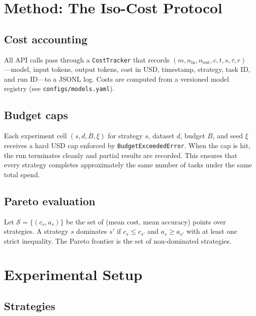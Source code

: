 \documentclass[11pt]{article}
\begin{document}
\section{Method: The Iso-Cost Protocol}

\subsection{Cost accounting}

All API calls pass through a \texttt{CostTracker} that records
$(m, n_{\text{in}}, n_{\text{out}}, c, t, s, \tau, r)$---model, input tokens,
output tokens, cost in USD, timestamp, strategy, task ID, and run ID---to a
JSONL log.  Costs are computed from a versioned model registry (see
\texttt{configs/models.yaml}).

\subsection{Budget caps}

Each experiment cell $(s, d, B, \xi)$ for strategy $s$, dataset $d$, budget
$B$, and seed $\xi$ receives a hard USD cap enforced by
\texttt{BudgetExceededError}.  When the cap is hit, the run terminates cleanly
and partial results are recorded.  This ensures that every strategy completes
approximately the same number of tasks under the same total spend.

\subsection{Pareto evaluation}

Let $\mathcal{S} = \{(c_s, a_s)\}$ be the set of (mean cost, mean accuracy)
points over strategies.  A strategy $s$ dominates $s'$ if
$c_s \le c_{s'}$ and $a_s \ge a_{s'}$ with at least one strict inequality.
The Pareto frontier is the set of non-dominated strategies.

\section{Experimental Setup}

\subsection{Strategies}
\end{document}
